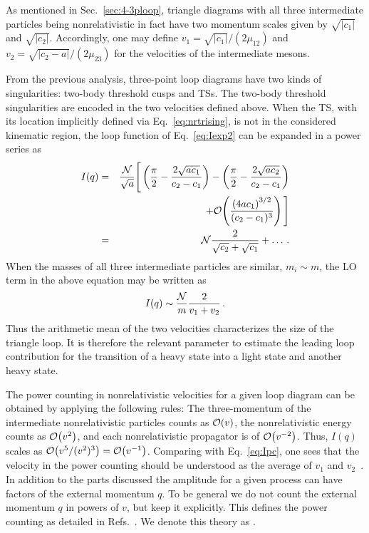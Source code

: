 As mentioned in Sec.~\ref{sec:4-3ploop},  triangle diagrams with all
three intermediate particles being nonrelativistic in fact have two momentum
scales given by $\sqrt{|c_1|}$ and $\sqrt{|c_2|}$. Accordingly, one may define 
$v_1 = \sqrt{|c_1|}/(2\mu_{12})$ and $v_2=\sqrt{|c_2-a|}/(2\mu_{23})$ for the 
velocities of the intermediate mesons. 

From the previous analysis, three-point loop diagrams have two kinds of
singularities: two-body threshold cusps and TSs.
The two-body threshold singularities are encoded in the two velocities defined
above. When the TS, with its location implicitly defined via
Eq.~\eqref{eq:nrtrising}, is not in the considered kinematic region, the loop
function of Eq.~\eqref{eq:Iexp2} can be expanded in a power series as
\begin{eqnarray}
 I(q) &=& \frac{\mathcal{N}}{\sqrt{a} } \Bigg[ \left(\frac{\pi}{2} - 
\frac{2\sqrt{ac_1}}{c_2-c_1} \right) - \left(\frac{\pi}{2} - 
\frac{2\sqrt{ac_2}}{c_2-c_1} \right)  \nonumber\\ 
&& + \mathcal{O}\!\left( \frac{\left(4 a c_1\right)^{3/2}}{(c_2-c_1)^3} \right)\!\, \Bigg] 
\nonumber\\ 
&=& {\cal N} \frac{2}{\sqrt{c_2}+\sqrt{c_1}} + \ldots\,.
  \label{eq:simplifiedI}
\end{eqnarray}
When the masses of all three intermediate particles are similar, 
$m_i\sim m$, the LO term in the above equation may be written as 
\begin{eqnarray}
    I(q) \sim \frac{{\cal N}}{m} \frac{2}{v_1+v_2} \, .
  \label{eq:Ipc}
\end{eqnarray}
Thus the arithmetic mean of the two velocities characterizes the size of the 
triangle loop. It is therefore the relevant parameter to estimate the leading 
loop contribution 
for the transition of a heavy state into a light state and another heavy state.

The power counting in nonrelativistic velocities for a given loop diagram can be
obtained by applying the following rules: The three-momentum of the intermediate
nonrelativistic particles counts as $\mathcal{O}\!\left(v\right)\!\,$, the nonrelativistic energy
counts as $\mathcal{O}\!\left(v^2\right)\!\,$, and each nonrelativistic propagator is of
$\mathcal{O}\!\left(v^{-2}\right)\!\,$. Thus, $I(q)$ scales as $\mathcal{O}\!\left( v^5/(v^2)^3 \right)\!\,=\mathcal{O}\!\left(v^{-1}\right)\!\,$.
Comparing with Eq.~\eqref{eq:Ipc}, one sees that the velocity in the power
counting should be understood as the average of $v_1$ and
$v_2$~\cite{Guo:2012tg}.
In addition to the parts discussed the amplitude for a given process can have
factors of the external momentum $q$. To be general we do not count the external
momentum $q$ in powers of $v$, but keep it explicitly.
This defines the power counting as detailed in
Refs.~\cite{Guo:2009wr,Guo:2010zk,Guo:2010ak}. We denote this theory as \nreft.

